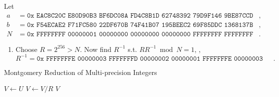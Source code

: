 \begin{example}
Let \begin{align*}
a &= \texttt{0x EAC8C20C E80D90B3 BF6DC08A FD4C8B1D 62748392 79D9F146 9BE87CCD 85283FE5},\\
b &= \texttt{0x F54ECAE2 F71FC580 22DF670B 74F41B07 195BEEC2 69F85DDC 1368137B C3DD50B3},\\
N &= \texttt{0x FFFFFFFF 00000001 00000000 00000000 00000000 FFFFFFFF FFFFFFFF FFFFFFFF}.
\end{align*} \begin{enumerate}[\bf 1.]
\item Choose $R=2^{256}>N.$ Now find $R^{-1}$ s.t. $RR^{-1}\bmod N=1$, \ie, \[
R^{-1}=\texttt{0x FFFFFFFE 00000003 FFFFFFFD 00000002 00000001 FFFFFFFE 00000003 00000000}.
\]
\end{enumerate}
\end{example}

\newpage
\begin{algorithm}[H]
	\DontPrintSemicolon
	\caption{Montgomery Reduction of Multi-precision Integers}
	\BlankLine
	\BlankLine
	\BlankLine
	$V\gets U$
	$V\gets V / R$\;
	\Return $V$\;
\end{algorithm}

